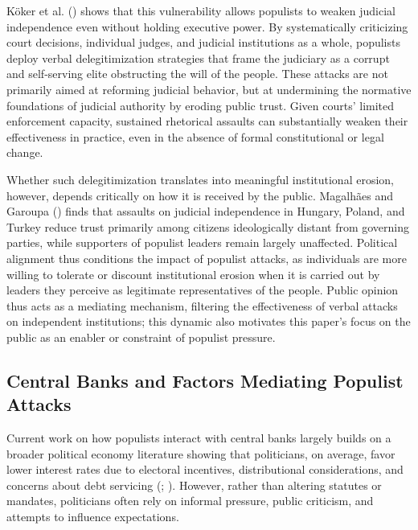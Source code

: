 \documentclass[
  11pt,
  letterpaper,
  DIV=11,
  numbers=noendperiod]{scrartcl}
\begin{document}
Köker et al. () shows that this
vulnerability allows populists to weaken judicial independence even
without holding executive power. By systematically criticizing court
decisions, individual judges, and judicial institutions as a whole,
populists deploy verbal delegitimization strategies that frame the
judiciary as a corrupt and self-serving elite obstructing the will of
the people. These attacks are not primarily aimed at reforming judicial
behavior, but at undermining the normative foundations of judicial
authority by eroding public trust. Given courts' limited enforcement
capacity, sustained rhetorical assaults can substantially weaken their
effectiveness in practice, even in the absence of formal constitutional
or legal change.

Whether such delegitimization translates into meaningful institutional
erosion, however, depends critically on how it is received by the
public. Magalhães and Garoupa ()
finds that assaults on judicial independence in Hungary, Poland, and
Turkey reduce trust primarily among citizens ideologically distant from
governing parties, while supporters of populist leaders remain largely
unaffected. Political alignment thus conditions the impact of populist
attacks, as individuals are more willing to tolerate or discount
institutional erosion when it is carried out by leaders they perceive as
legitimate representatives of the people. Public opinion thus acts as a
mediating mechanism, filtering the effectiveness of verbal attacks on
independent institutions; this dynamic also motivates this paper's focus
on the public as an enabler or constraint of populist pressure.

\subsection{Central Banks and Factors Mediating Populist
Attacks}\label{central-banks-and-factors-mediating-populist-attacks}

Current work on how populists interact with central banks largely builds
on a broader political economy literature showing that politicians, on
average, favor lower interest rates due to electoral incentives,
distributional considerations, and concerns about debt servicing
(;
). However, rather than
altering statutes or mandates, politicians often rely on informal
pressure, public criticism, and attempts to influence expectations.
\end{document}
